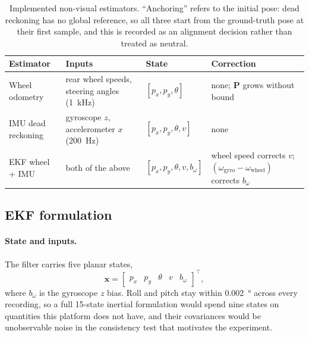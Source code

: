 \begin{table}[htbp]
\centering
\caption{Implemented non-visual estimators. ``Anchoring'' refers to the initial
pose: dead reckoning has no global reference, so all three start from the
ground-truth pose at their first sample, and this is recorded as an alignment
decision rather than treated as neutral.}
\label{tab:proprio-estimators}
\small
\begin{tabularx}{\textwidth}{>{\raggedright\arraybackslash}p{}>{\raggedright\arraybackslash}p{}>{\raggedright\arraybackslash}p{}>{\raggedright\arraybackslash}X}
\toprule
Estimator & Inputs & State & Correction \\
\midrule
Wheel odometry & rear wheel speeds, steering angles (\SI{1}{\kilo\hertz}) &
  $[p_x,p_y,\theta]$ & none; $\mathbf{P}$ grows without bound \\
IMU dead reckoning & gyroscope $z$, accelerometer $x$ (\SI{200}{\hertz}) &
  $[p_x,p_y,\theta,v]$ & none \\
EKF wheel + IMU & both of the above & $[p_x,p_y,\theta,v,b_\omega]$ & wheel speed
  corrects $v$; $(\omega_{\text{gyro}}-\omega_{\text{wheel}})$ corrects
  $b_\omega$ \\
\bottomrule
\end{tabularx}
\end{table}

\subsection{EKF formulation}
\label{sec:ekf-formulation}

\paragraph{State and inputs.} The filter carries five planar states,
\begin{equation}
  \mathbf{x} = \begin{bmatrix}p_x & p_y & \theta & v & b_\omega\end{bmatrix}^{\top},
  \label{eq:ekf-state}
\end{equation}
where $b_\omega$ is the gyroscope $z$ bias. Roll and pitch stay within
\SI{0.002}{\degree} across every recording, so a full 15-state inertial
formulation would spend nine states on quantities this platform does not have,
and their covariances would be unobservable noise in the consistency test that
motivates the experiment.

